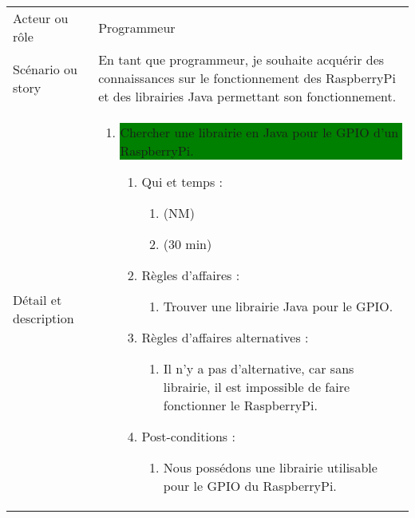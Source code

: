 \begin{longtable}{|l|p{}|}
\hline
    \rowcolor{Gray}
    \multicolumn{2}{|l|}{5} \\
\hline
    Acteur ou rôle & Programmeur \\
\hline
    Scénario ou story & En tant que programmeur, je
    souhaite acquérir des connaissances sur le fonctionnement des RaspberryPi et des librairies Java permettant son fonctionnement. \\
\hline
    Détail et description &
        \begin{enumerate}[label*=\arabic*.]
            \item \colorbox{Green}{\parbox{13cm}{Chercher une librairie en Java pour le GPIO d'un RaspberryPi.}}
                \begin{enumerate}[label*=\arabic*.]
                                \item Qui et temps :
                                \begin{enumerate}[label*=\arabic*.]
                                    \item (NM)
                                    \item (30 min)
                                \end{enumerate}
                                \item Règles d'affaires :
                                \begin{enumerate}[label*=\arabic*.]
                                    \item Trouver une librairie Java pour le GPIO.
                                \end{enumerate}
                                \item Règles d'affaires alternatives :
                                \begin{enumerate}[label*=\arabic*.]
                                    \item Il n'y a pas d'alternative, car sans librairie, il est impossible de faire fonctionner le RaspberryPi.
                                \end{enumerate}
                                \item Post-conditions :
                                \begin{enumerate}[label*=\arabic*.]
                                    \item Nous possédons une librairie utilisable pour le GPIO du RaspberryPi.
                                \end{enumerate}
                            \end{enumerate}

\end{enumerate}
\end{longtable}
